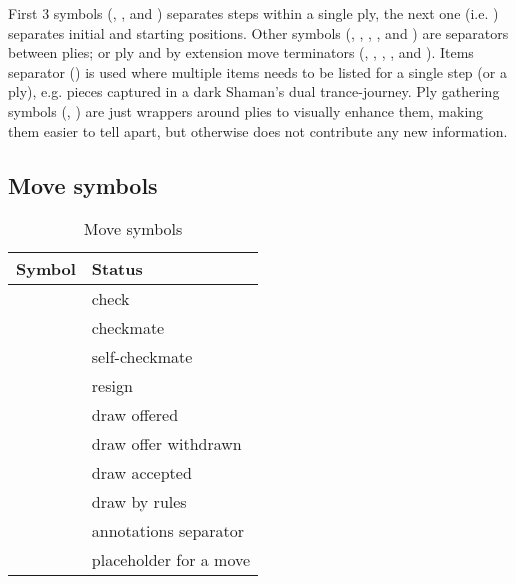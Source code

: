 First 3 symbols (, , and \alg{-}) separates steps within a single ply,
the next one (i.e. \alg{\textbackslash}) separates initial and starting positions.
Other symbols (\alg{\~{}}, \alg{|}, , \alg{;;}, and ) are separators
between plies; or ply and \textendash{}by extension\textendash{} move terminators
(\alg{||}, \alg{|||}, , , and ).\newline
\indent
Items separator (\alg{,}) is used where multiple items needs to be listed for a single
step (or a ply), e.g. pieces captured in a dark Shaman's dual trance-journey.\newline
\indent
Ply gathering symbols (\alg{[}, \alg{]}) are just wrappers around plies to visually
enhance them, making them easier to tell apart, but otherwise does not contribute any
new information.

\clearpage %

\subsection*{Move symbols}
\label{sec:Appendix/Summary/Move symbols}

\begin{table}[!h]
\centering
\begin{tabular}{ rl }
\toprule %
\textbf{Symbol}      & \textbf{Status}                \\
\midrule %
\alg{+}              & check                          \\
\alg{\#}             & checkmate                      \\
\alg{\#}             & self-checkmate                 \\
\alg{\#\#}           & resign                         \\
\cmidrule{1-2} %
\alg{(=)}            & draw offered                   \\
\alg{()}             & draw offer withdrawn           \\
\alg{(==)}           & draw accepted                  \\
\alg{(===)}          & draw by rules                  \\
\cmidrule{1-2} %
\alg{\_}             & annotations separator          \\
\alg{...}            & placeholder for a move         \\
\bottomrule %
\end{tabular}
\caption{Move symbols}
\label{tbl:Appendix/Summary/Move symbols}
\end{table}

